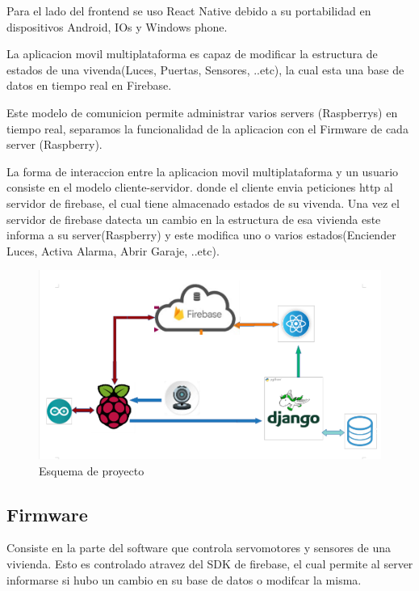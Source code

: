 \documentclass[letterpaper,12pt]{article}
\begin{document}
{		Para el lado del frontend se uso React Native debido a su portabilidad en dispositivos Android, IOs y Windows phone.
		
		La aplicacion movil multiplataforma es capaz de modificar la estructura de estados de una vivenda(Luces, Puertas, Sensores, ..etc), la cual esta una base de datos en tiempo real  en Firebase.
		
		Este modelo de comunicion permite administrar varios servers (Raspberrys) en tiempo real,  separamos la funcionalidad de la aplicacion con el Firmware de cada server (Raspberry).
		
		La forma de interaccion  entre la aplicacion movil  multiplataforma y un usuario consiste en el modelo  cliente-servidor. donde el cliente  envia peticiones http al servidor de firebase, el cual tiene almacenado estados de su vivenda. Una vez el servidor de firebase datecta un cambio en la estructura de esa vivienda  este informa a su server(Raspberry) y este modifica uno o varios estados(Enciender Luces, Activa Alarma, Abrir Garaje, ..etc).
		
		
		\begin{figure}[h]
			
			\begin{minipage}[t]{17cm}
				\includegraphics[width=15cm]{images/esquema1.png}	 %
				\caption{ Esquema de proyecto }
			\end{minipage}
			
		\end{figure}
		
		
		\subsection{Firmware}
		
		Consiste en la parte del software que controla servomotores y sensores de una vivienda. Esto es controlado atravez del SDK de firebase,  el cual permite al server informarse si hubo un cambio en su base de datos o modifcar la misma. 
		
}
\end{document}

